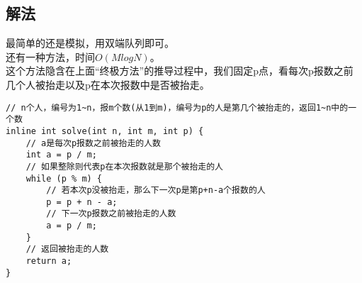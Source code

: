     \subsection{解法}
        最简单的还是模拟，用双端队列即可。\\
        还有一种方法，时间$O(MlogN)$。\\
        这个方法隐含在上面“终极方法”的推导过程中，我们固定p点，看每次p报数之前几个人被抬走以及p在本次报数中是否被抬走。
\begin{lstlisting}
// n个人，编号为1~n，报m个数(从1到m)，编号为p的人是第几个被抬走的，返回1~n中的一个数
inline int solve(int n, int m, int p) {
    // a是每次p报数之前被抬走的人数
    int a = p / m;
    // 如果整除则代表p在本次报数就是那个被抬走的人
    while (p % m) {
        // 若本次p没被抬走，那么下一次p是第p+n-a个报数的人
        p = p + n - a;
        // 下一次p报数之前被抬走的人数
        a = p / m;
    }
    // 返回被抬走的人数
    return a;
}
\end{lstlisting}